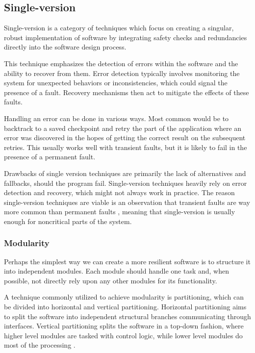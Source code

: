 
\subsection{Single-version} \label{single}

Single-version is a category of techniques which focus on creating a singular, robust implementation of software by integrating safety checks and redundancies directly into the software design process.

This technique emphasizes the detection of errors within the software and the ability to recover from them. Error detection typically involves monitoring the system for unexpected behaviors or inconsistencies, which could signal the presence of a fault. Recovery mechanisms then act to mitigate the effects of these faults.

Handling an error can be done in various ways. Most common would be to backtrack to a saved checkpoint and retry the part of the application where an error was discovered in the hopes of getting the correct result on the subsequent retries. This usually works well with transient faults, but it is likely to fail in the presence of a permanent fault.

Drawbacks of single version techniques are primarily the lack of alternatives and fallbacks, should the program fail. Single-version techniques heavily rely on error detection and recovery, which might not always work in practice. The reason single-version techniques are viable is an observation that transient faults are way more common than permanent faults \cite{1676899}, meaning that single-version is usually enough for noncritical parts of the system.

\subsubsection{Modularity}

Perhaps the simplest way we can create a more resilient software is to structure it into independent modules. Each module should handle one task and, when possible, not directly rely upon any other modules for its functionality.

A technique commonly utilized to achieve modularity is partitioning, which can be divided into horizontal and vertical partitioning. Horizontal partitioning aims to split the software into independent structural branches communicating through interfaces. 
Vertical partitioning splits the software in a top-down fashion, where higher level modules are tasked with control logic, while lower level modules do most of the processing \cite{nasa:sft}.

